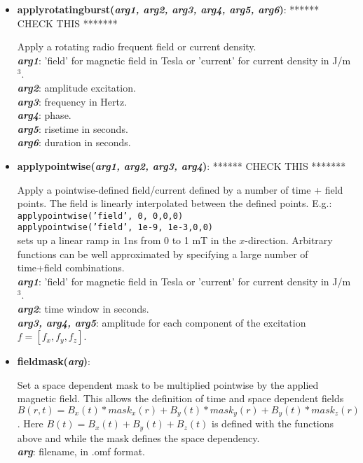 \begin{itemize}
 \item {\vspace{-0.4cm}\textbf{applyrotatingburst(\textit{arg1, arg2, arg3, arg4, arg5, arg6})}:   ****** CHECK THIS *******
				\flushright\parbox{0.9 \textwidth}{\vspace{-0.25cm} 
				Apply a rotating radio frequent field or current density.\\
				\textbf{\textit{arg1}}: 'field' for magnetic field in Tesla or 'current' for current density in J/m$^3$.\\
				\textbf{\textit{arg2}}: amplitude excitation.\\
				\textbf{\textit{arg3}}: frequency in Hertz.\\
				\textbf{\textit{arg4}}: phase.\\
				\textbf{\textit{arg5}}: risetime in seconds.\\
				\textbf{\textit{arg6}}: duration in seconds.
				}\flushleft}

 \item {\vspace{-0.4cm}\textbf{applypointwise(\textit{arg1, arg2, arg3, arg4})}:   ****** CHECK THIS *******
				\flushright\parbox{0.9 \textwidth}{\vspace{-0.25cm} 
				Apply a pointwise-defined field/current defined by a number of time + field points.  The field is linearly interpolated between the defined points.	E.g.:\\ 
				\qquad\texttt{applypointwise('field', 0, 0,0,0)}\\
				\qquad\texttt{applypointwise('field', 1e-9, 1e-3,0,0)} \\
				sets up a linear ramp in 1ns from 0 to 1 mT in the $x$-direction.  Arbitrary functions can be well approximated by specifying a large number of time+field combinations.\\
				\textbf{\textit{arg1}}: 'field' for magnetic field in Tesla or 'current' for current density in J/m$^3$.\\
				\textbf{\textit{arg2}}: time window in seconds.\\
				\textbf{\textit{arg3, arg4, arg5}}: amplitude for each component of the excitation $f = [f_x, f_y, f_z]$.
				}\flushleft}

 \item {\vspace{-0.4cm}\textbf{fieldmask(\textit{arg})}:
				\flushright\parbox{0.9 \textwidth}{\vspace{-0.25cm} 
				Set a space dependent mask to be multiplied pointwise by the applied magnetic field.  This allows the definition of time and space dependent fields $B(r,t) = B_x(t)*mask_x(r) + B_y(t)*mask_y(r) + B_y(t)*mask_z(r)$.  Here $B(t)= B_x(t) + B_y(t) + B_z(t)$ is defined with the functions above and while the mask defines the space dependency.\\
				\textbf{\textit{arg}}: filename, in .omf format.
				}\flushleft}


\end{itemize}
